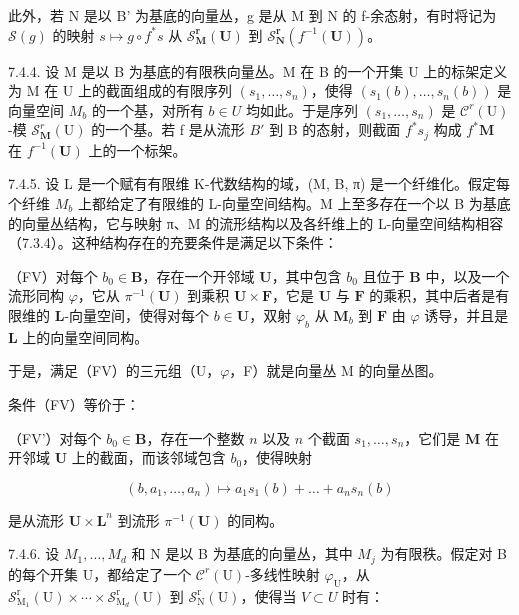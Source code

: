 此外，若 N 是以 B' 为基底的向量丛，g 是从 M 到 N 的 f-余态射，有时将记为 \(\mathcal{S}(g)\) 的映射 \(s \mapsto g \circ f^{*}s\) 从 \(\mathcal{S}_{\mathbf{M}}^{\mathbf{r}}(\mathbf{U})\) 到 \(\mathcal{S}_{\mathbf{N}}^{\mathbf{r}}(f^{-1}(\mathbf{U}))\)。

7.4.4. 设 M 是以 B 为基底的有限秩向量丛。M 在 B 的一个开集 U 上的标架定义为 M 在 U 上的截面组成的有限序列 \((s_{1},\ldots,s_{n})\)，使得 \((s_{1}(b),\ldots,s_{n}(b))\) 是向量空间 \(M_{b}\) 的一个基，对所有 \(b\in U\) 均如此。于是序列 \((s_{1},\ldots,s_{n})\) 是 \(\mathcal{C}^{r}(\mathrm{U})\)-模 \(\mathcal{S}_{\mathbf{M}}^{r}(\mathrm{U})\) 的一个基。若 f 是从流形 \(B'\) 到 B 的态射，则截面 \(f^{*}s_{j}\) 构成 \(f^{*}\mathbf{M}\) 在 \(f^{-1}(\mathbf{U})\) 上的一个标架。

7.4.5. 设 L 是一个赋有有限维 K-代数结构的域，(M, B, π) 是一个纤维化。假定每个纤维 \(M_{b}\) 上都给定了有限维的 L-向量空间结构。M 上至多存在一个以 B 为基底的向量丛结构，它与映射 π、M 的流形结构以及各纤维上的 L-向量空间结构相容（7.3.4）。这种结构存在的充要条件是满足以下条件：

（FV）对每个 \(b_0 \in \mathbf{B}\)，存在一个开邻域 \(\mathbf{U}\)，其中包含 \(b_0\) 且位于 \(\mathbf{B}\) 中，以及一个流形同构 \(\varphi\)，它从 \(\pi^{-1}(\mathbf{U})\) 到乘积 \(\mathbf{U} \times \mathbf{F}\)，它是 \(\mathbf{U}\) 与 \(\mathbf{F}\) 的乘积，其中后者是有限维的 \(\mathbf{L}\)-向量空间，使得对每个 \(b \in \mathbf{U}\)，双射 \(\varphi_b\) 从 \(\mathbf{M}_b\) 到 \(\mathbf{F}\) 由 \(\varphi\) 诱导，并且是 \(\mathbf{L}\) 上的向量空间同构。

于是，满足（FV）的三元组（U，\(\varphi\)，F）就是向量丛 M 的向量丛图。

条件（FV）等价于：

（FV'）对每个 \(b_0 \in \mathbf{B}\)，存在一个整数 \(n\) 以及 \(n\) 个截面 \(s_1, \ldots, s_n\)，它们是 \(\mathbf{M}\) 在开邻域 \(\mathbf{U}\) 上的截面，而该邻域包含 \(b_0\)，使得映射

\[
(b, a _ {1}, \dots , a _ {n}) \mapsto a _ {1} s _ {1} (b) + \dots + a _ {n} s _ {n} (b)
\]

是从流形 \(\mathbf{U} \times \mathbf{L}^{n}\) 到流形 \(\pi^{-1}(\mathbf{U})\) 的同构。

7.4.6. 设 \(M_{1},\ldots,M_{d}\) 和 N 是以 B 为基底的向量丛，其中 \(M_{j}\) 为有限秩。假定对 B 的每个开集 U，都给定了一个 \(\mathcal{C}^{r}(\mathrm{U})\)-多线性映射 \(\varphi_{\mathrm{U}}\)，从 \(\mathcal{S}_{\mathrm{M}_{1}}^{\mathrm{r}}(\mathrm{U})\times\cdots\times\mathcal{S}_{\mathrm{M}_{d}}^{\mathrm{r}}(\mathrm{U})\) 到 \(\mathcal{S}_{\mathrm{N}}^{\mathrm{r}}(\mathrm{U})\)，使得当 \(V \subset U\) 时有：

